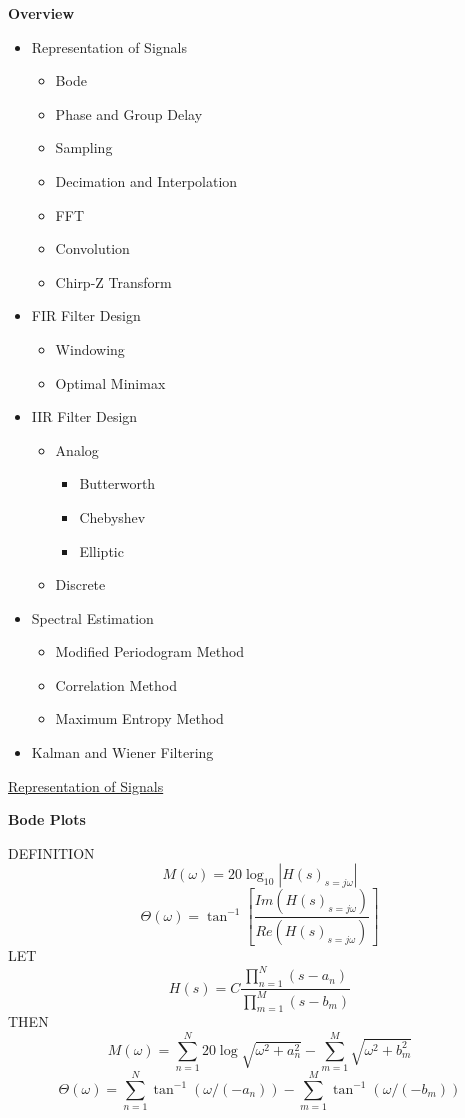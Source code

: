 
\begin{slide}
{}
\begin{center}
{\bf Overview}
\end{center}
{\tiny
\begin{itemize}
\item Representation of Signals
   \begin{itemize}
   \item Bode
   \item Phase and Group Delay
   \item Sampling
   \item Decimation and Interpolation
   \item FFT
   \item Convolution
   \item Chirp-Z Transform
   \end{itemize}
\item FIR Filter Design
   \begin{itemize}
   \item Windowing
   \item Optimal Minimax
   \end{itemize}
\item IIR Filter Design
   \begin{itemize}
   \item Analog
      \begin{itemize}
      \item Butterworth
      \item Chebyshev
      \item Elliptic
      \end{itemize}
   \item Discrete
   \end{itemize}
\item Spectral Estimation
   \begin{itemize}
   \item Modified Periodogram Method
   \item Correlation Method
   \item Maximum Entropy Method
   \end{itemize}
\item Kalman and Wiener Filtering
\end{itemize}
}
\end{slide}
\begin{slide}
{}
{\tiny\underline{Representation of Signals}}
\begin{center}
{\bf Bode Plots}
\end{center}
\vfill
\vbox{
{\tiny
DEFINITION
%
$$
M(\omega)=20\log_{10}|H(s)_{s=j\omega}|
$$
%
\vfil
%
$$
\Theta(\omega)=\tan^{-1}[\frac{Im(H(s)_{s=j\omega})}{Re(H(s)_{s=j\omega})}]
$$
%
\vfil\vfil
LET
%
$$
H(s)=C\frac{\prod_{n=1}^{N}(s-a_n)}{\prod_{m=1}^{M}(s-b_m)}
$$
%
\vfil\vfil
THEN
%
$$
M(\omega)=\sum_{n=1}^{N}20\log\sqrt{\omega^2+a_n^2}-\sum_{m=1}^M\sqrt{\omega^2+b_m^2}
$$
%
\vfil
%
$$
\Theta(\omega)=\sum_{n=1}^{N}\tan^{-1}(\omega/(-a_n))-\sum_{m=1}^M\tan^{-1}(\omega/(-b_m))
$$
%
}}
\vfill
\end{slide}
